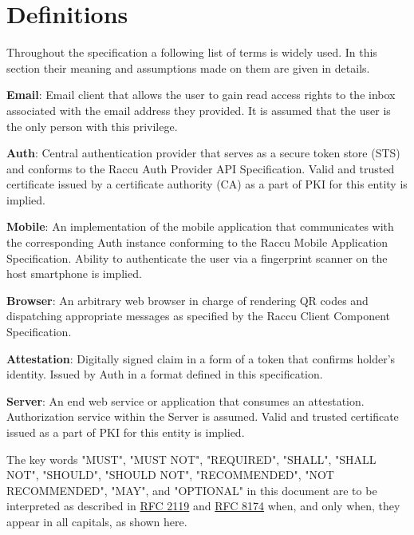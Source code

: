 \section{Definitions}
Throughout the specification a following list of terms is widely used. In this section their meaning and assumptions 
made on them are given in details.

\medskip
\textbf{Email}: Email client that allows the user to gain read access rights to the inbox associated
with the email address they provided. It is assumed that the user is the only person with this privilege.

\medskip
\textbf{Auth}: Central authentication provider that serves as a secure token store (STS) and conforms to 
the Raccu Auth Provider API Specification. Valid and trusted certificate issued by a certificate authority
(CA) as a part of PKI for this entity is implied.

\medskip
\textbf{Mobile}: An implementation of the mobile application that communicates with the corresponding Auth instance 
conforming to the Raccu Mobile Application Specification. Ability to authenticate the user via a fingerprint scanner
on the host smartphone is implied.

\medskip
\textbf{Browser}: An arbitrary web browser in charge of rendering QR codes and dispatching appropriate messages  
as specified by the Raccu Client Component Specification.

\medskip
\textbf{Attestation}: Digitally signed claim in a form of a token that confirms holder's identity. Issued by 
Auth in a format defined in this specification.

\medskip
\textbf{Server}: An end web service or application that consumes an attestation. Authorization service within the 
Server is assumed. Valid and trusted certificate issued as a part of PKI for this entity is implied.

\medskip
The key words "MUST", "MUST NOT", "REQUIRED", "SHALL", "SHALL NOT", "SHOULD", "SHOULD NOT", "RECOMMENDED", 
"NOT RECOMMENDED", "MAY", and "OPTIONAL" in this document are to be interpreted as described in 
\href{https://tools.ietf.org/html/rfc2119}{RFC 2119} and \href{https://tools.ietf.org/html/rfc8174}{RFC 8174} 
when, and only when, they appear in all capitals, as shown here.

